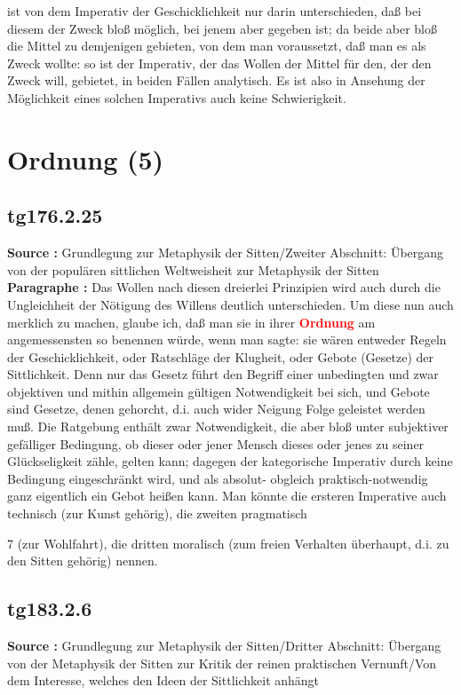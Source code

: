 \documentclass[a4paper,12pt,twoside]{book}
\newcommand{\match}[1]{\textcolor{red}{\textbf{#1}}}
\newcommand{\unnumberedsection}[1]{
	\section*{#1}
	\addcontentsline{toc}{section}{#1}
	\markright{#1}
}
\begin{document}
ist von dem Imperativ der Geschicklichkeit nur darin unterschieden, daß bei diesem der Zweck bloß möglich, bei jenem aber gegeben ist; da beide aber bloß die Mittel zu demjenigen gebieten, von dem man voraussetzt, daß man es als Zweck wollte: so ist der  Imperativ, der das Wollen der Mittel für den, der den Zweck will, gebietet, in beiden Fällen analytisch. Es ist also in Ansehung der Möglichkeit eines solchen Imperativs auch keine Schwierigkeit. 
	
	\unnumberedsection{Ordnung (5)} 
	\subsection*{tg176.2.25} 
	\textbf{Source : }Grundlegung zur Metaphysik der Sitten/Zweiter Abschnitt: Übergang von der populären sittlichen Weltweisheit zur Metaphysik der Sitten\\  
	
	\noindent\textbf{Paragraphe : }Das Wollen nach diesen dreierlei Prinzipien wird auch durch die Ungleichheit der Nötigung des Willens deutlich unterschieden. Um diese nun auch merklich zu machen, glaube ich, daß man sie in ihrer \match{Ordnung} am angemessensten so benennen würde, wenn man sagte: sie wären entweder Regeln der Geschicklichkeit, oder Ratschläge der  Klugheit, oder Gebote (Gesetze) der Sittlichkeit. Denn nur das Gesetz führt den Begriff einer unbedingten und zwar objektiven und mithin allgemein gültigen Notwendigkeit bei sich, und Gebote sind Gesetze, denen gehorcht, d.i. auch wider Neigung Folge geleistet werden muß. Die Ratgebung enthält zwar Notwendigkeit, die aber bloß unter subjektiver gefälliger Bedingung, ob dieser oder jener Mensch dieses oder jenes zu seiner Glückseligkeit zähle, gelten kann; dagegen der kategorische Imperativ durch keine Bedingung eingeschränkt wird, und als absolut- obgleich praktisch-notwendig ganz eigentlich ein Gebot heißen kann. Man könnte die ersteren Imperative auch technisch (zur Kunst gehörig), die zweiten pragmatisch
	
	
	
	7
	(zur Wohlfahrt), die dritten moralisch (zum freien Verhalten überhaupt, d.i. zu den Sitten gehörig) nennen. 
	
	\subsection*{tg183.2.6} 
	\textbf{Source : }Grundlegung zur Metaphysik der Sitten/Dritter Abschnitt: Übergang von der Metaphysik der Sitten zur Kritik der reinen praktischen Vernunft/Von dem Interesse, welches den Ideen der Sittlichkeit anhängt\\  
	
\end{document}
